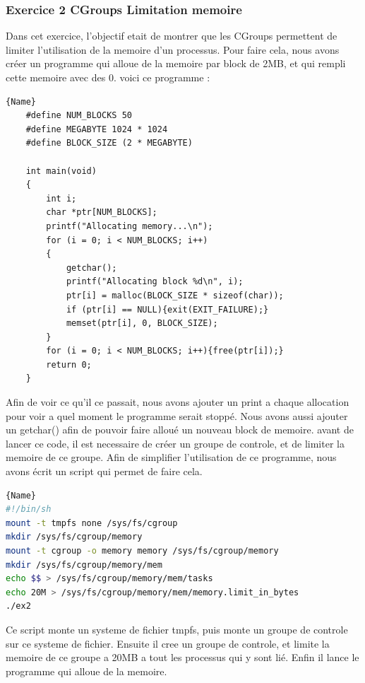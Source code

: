\documentclass[
	a4paper, %
	10pt, %
]{CSUniSchoolLabReport}
\begin{document}
\subsubsection{Exercice 2 CGroups Limitation memoire}\label{MPEx2}
Dans cet exercice, l'objectif etait de montrer que les CGroups permettent de limiter l'utilisation de la memoire d'un processus.
Pour faire cela, nous avons créer un programme qui alloue de la memoire par block de 2MB, et qui rempli cette memoire avec des 0.
voici ce programme : \\
\begin{lstlisting}[style=CStyle, caption=Allocation de memoire]{Name}
	#define NUM_BLOCKS 50
	#define MEGABYTE 1024 * 1024
	#define BLOCK_SIZE (2 * MEGABYTE)
	
	int main(void)
	{
		int i;
		char *ptr[NUM_BLOCKS];
		printf("Allocating memory...\n");
		for (i = 0; i < NUM_BLOCKS; i++)
		{
			getchar();
			printf("Allocating block %d\n", i);
			ptr[i] = malloc(BLOCK_SIZE * sizeof(char));
			if (ptr[i] == NULL){exit(EXIT_FAILURE);}
			memset(ptr[i], 0, BLOCK_SIZE);
		}
		for (i = 0; i < NUM_BLOCKS; i++){free(ptr[i]);}
		return 0;
	}
\end{lstlisting}
Afin de voir ce qu'il ce passait, nous avons ajouter un print a chaque allocation pour voir a quel moment le programme serait stoppé.
Nous avons aussi ajouter un getchar() afin de pouvoir faire alloué un nouveau block de memoire.
\linebreak
avant de lancer ce code, il est necessaire de créer un groupe de controle, et de limiter la memoire de ce groupe. Afin de simplifier l'utilisation de ce programme, nous avons écrit un script qui permet de faire cela.

\begin{lstlisting}[language=bash]{Name}
#!/bin/sh
mount -t tmpfs none /sys/fs/cgroup
mkdir /sys/fs/cgroup/memory
mount -t cgroup -o memory memory /sys/fs/cgroup/memory
mkdir /sys/fs/cgroup/memory/mem
echo $$ > /sys/fs/cgroup/memory/mem/tasks
echo 20M > /sys/fs/cgroup/memory/mem/memory.limit_in_bytes
./ex2
\end{lstlisting}
Ce script monte un systeme de fichier tmpfs, puis monte un groupe de controle sur ce systeme de fichier.
Ensuite il cree un groupe de controle, et limite la memoire de ce groupe a 20MB a tout les processus qui y sont lié.
Enfin il lance le programme qui alloue de la memoire.
\end{document}
